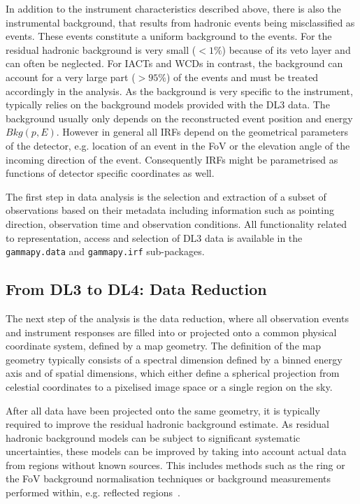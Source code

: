 \documentclass[longauth]{aa}
\newcommand{\code}[1]{\texttt{#1}}
\begin{document}
In addition to the instrument characteristics described above, there is also the instrumental
background, that results from hadronic events being misclassified as \gammaray events. These
events constitute a uniform background to the \gammaray events. For \fermi the residual hadronic background
is very small ($<1\%$) because of its veto layer and can often be neglected. For IACTs and WCDs in contrast,
the background can account for a very large part ($>95\%$) of the events and must be treated
accordingly in the analysis. As the background is very specific to the instrument, \gammapy typically 
relies on the background models provided with the DL3 data. The background usually only depends
on the reconstructed event position and energy $Bkg(p, E)$. However in general all IRFs depend on the
geometrical parameters of the detector, e.g. location of an event in the FoV or the elevation
angle of the incoming direction of the event. Consequently IRFs might be parametrised as functions
of detector specific coordinates as well.

The first step in \gammaray data analysis is the selection and extraction of a subset of
observations based on their metadata including information such as pointing direction,
observation time and observation conditions. All functionality related to representation, 
access and selection of DL3 data is available in the \code{gammapy.data} and \code{gammapy.irf}
sub-packages.


\subsection{From DL3 to DL4: Data Reduction}
The next step of the analysis is the data reduction, where all observation events and instrument
responses are filled into or projected onto a common physical coordinate system, defined by
a map geometry. The definition of the map geometry typically consists of a spectral dimension
defined by a binned energy axis and of spatial dimensions, which either define 
a spherical projection from celestial coordinates to a pixelised image space
or a single region on the sky.

After all data have been projected onto the same geometry, it is typically
required to improve the residual hadronic background estimate. As residual hadronic
background models can be subject to significant systematic uncertainties,
these models can be improved by taking into account actual data
from regions without known \gammaray sources. This includes methods 
such as the ring or the FoV background normalisation techniques or background measurements
performed within, e.g. reflected regions~\citep{Berge07}.
\end{document}
